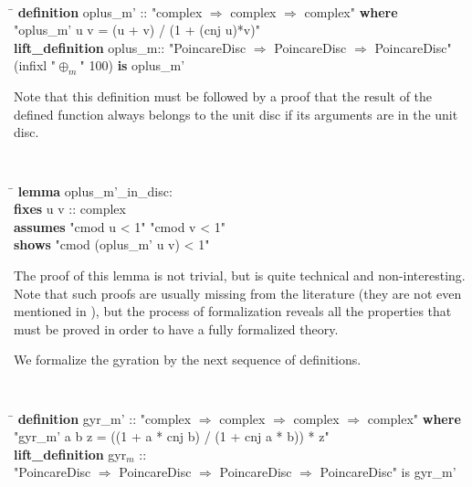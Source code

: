 \documentclass[a4paper]{article}
\newcommand{\tab}{\hspace{5mm}}
\theoremstyle{definition}
\begin{document}
{\tt
\begin{small}
\begin{tabbing}
\hspace{5mm}\=\kill
{\bf definition} oplus\_m' :: "complex $\Rightarrow$ complex $\Rightarrow$ complex" {\bf where}\\
\tab "oplus\_m' u v = (u + v) / (1 + (cnj u)*v)"\\

{\bf lift\_definition} oplus\_m:: "PoincareDisc $\Rightarrow$ PoincareDisc $\Rightarrow$ PoincareDisc" \\
\tab (infixl "$\oplus_m$" 100) {\bf is} oplus\_m'
\end{tabbing}
\end{small}
}

Note that this definition must be followed by a proof that the result
of the defined function always belongs to the unit disc if its
arguments are in the unit disc.

{\tt
\begin{small}
\begin{tabbing}
\hspace{5mm}\=\kill
{\bf lemma} oplus\_m'\_in\_disc:\\
\>  {\bf fixes} u v :: complex\\
\>  {\bf assumes} "cmod u < 1" "cmod v < 1"\\
\>  {\bf shows} "cmod (oplus\_m' u v) < 1"
\end{tabbing}
\end{small}
}

\noindent The proof of this lemma is not trivial, but is quite
technical and non-interesting. Note that such proofs are usually
missing from the literature (they are not even mentioned in
\cite{ungar-analytic}), but the process of formalization reveals all
the properties that must be proved in order to have a fully formalized
theory.

We formalize the gyration by the next sequence of definitions.

{\tt
\begin{small}
\begin{tabbing}
\hspace{5mm}\=\kill
{\bf definition} gyr\_m' :: "complex $\Rightarrow$ complex $\Rightarrow$ complex $\Rightarrow$ complex" {\bf where}\\
\>  "gyr\_m' a b z = ((1 + a * cnj b) / (1 + cnj a * b)) * z"\\
{\bf lift\_definition} gyr$_m$ ::\\
\>"PoincareDisc $\Rightarrow$ PoincareDisc $\Rightarrow$ PoincareDisc $\Rightarrow$ PoincareDisc" is gyr\_m'
\end{tabbing}
\end{small}
}
\end{document}
